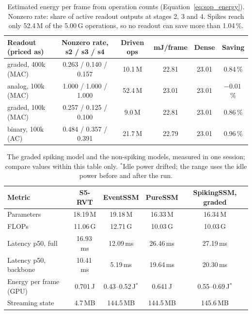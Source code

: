 \documentclass[11pt, a4paper]{report}
\begin{document}
\begin{table}[htbp]
\centering
\caption[Estimated energy saving per readout]{Estimated energy per frame from operation counts (Equation~\eqref{eq:sop_energy}). Nonzero rate: share of
    active readout outputs at stages 2, 3 and 4. Spikes reach only 52.4\,M of the 5.00\,G operations, so no
    readout can save more than 1.04\,\%.}
\label{tab:sop}
\small
\setlength{\tabcolsep}{3.5pt}
\begin{tabular}{lccccc}
\toprule
\textbf{Readout (priced as)} & \textbf{Nonzero rate, s2 / s3 / s4} & \textbf{Driven ops} & \textbf{mJ/frame} & \textbf{Dense} & \textbf{Saving} \\
\midrule
graded, 400k (MAC) & 0.263 / 0.140 / 0.157 & 10.1\,M & 22.81 & 23.01 & 0.84\,\% \\
analog, 100k (MAC) & 1.000 / 1.000 / 1.000 & 52.4\,M & 23.01 & 23.01 & $-0.01$\,\% \\
graded, 100k (MAC) & 0.257 / 0.125 / 0.100 & 9.0\,M & 22.81 & 23.01 & 0.86\,\% \\
binary, 100k (AC)  & 0.484 / 0.357 / 0.391 & 21.7\,M & 22.79 & 23.01 & 0.96\,\% \\
\bottomrule
\end{tabular}
\end{table}

\begin{table}[htbp]
\centering
\caption[Benchmark of the graded readout and the non-spiking models]{The graded spiking model and the non-spiking models, measured in one session; compare values within this
    table only. $^{*}$Idle power drifted; the range uses the idle power before and after the run.}
\label{tab:spiking_bench}
\begin{tabular}{lcccc}
\toprule
\textbf{Metric} & \textbf{S5-RVT} & \textbf{EventSSM} & \textbf{PureSSM} & \textbf{SpikingSSM, graded} \\
\midrule
Parameters              & 18.19\,M & 19.18\,M & 16.33\,M & 16.34\,M \\
FLOPs                   & 11.06\,G & 12.71\,G & 10.03\,G & 10.03\,G \\
Latency p50, full       & 16.93\,ms & 12.09\,ms & 26.46\,ms & 27.19\,ms \\
Latency p50, backbone   & 10.41\,ms & 5.19\,ms & 19.64\,ms & 20.30\,ms \\
Energy per frame (GPU)  & 0.701\,J & 0.43--0.52\,J$^{*}$ & 0.641\,J & 0.55--0.69\,J$^{*}$ \\
Streaming state         & 4.7\,MB & 144.5\,MB & 144.5\,MB & 145.6\,MB \\
\bottomrule
\end{tabular}
\end{table}
\end{document}
